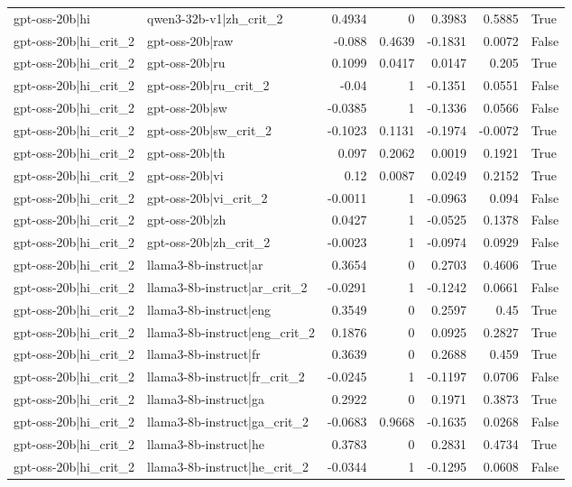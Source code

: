 \begin{table}
\begin{tabular}{l l r r r r l}
gpt-oss-20b|hi & qwen3-32b-v1|zh_crit_2 & 0.4934 & 0 & 0.3983 & 0.5885 & True \\
gpt-oss-20b|hi_crit_2 & gpt-oss-20b|raw & -0.088 & 0.4639 & -0.1831 & 0.0072 & False \\
gpt-oss-20b|hi_crit_2 & gpt-oss-20b|ru & 0.1099 & 0.0417 & 0.0147 & 0.205 & True \\
gpt-oss-20b|hi_crit_2 & gpt-oss-20b|ru_crit_2 & -0.04 & 1 & -0.1351 & 0.0551 & False \\
gpt-oss-20b|hi_crit_2 & gpt-oss-20b|sw & -0.0385 & 1 & -0.1336 & 0.0566 & False \\
gpt-oss-20b|hi_crit_2 & gpt-oss-20b|sw_crit_2 & -0.1023 & 0.1131 & -0.1974 & -0.0072 & True \\
gpt-oss-20b|hi_crit_2 & gpt-oss-20b|th & 0.097 & 0.2062 & 0.0019 & 0.1921 & True \\
gpt-oss-20b|hi_crit_2 & gpt-oss-20b|vi & 0.12 & 0.0087 & 0.0249 & 0.2152 & True \\
gpt-oss-20b|hi_crit_2 & gpt-oss-20b|vi_crit_2 & -0.0011 & 1 & -0.0963 & 0.094 & False \\
gpt-oss-20b|hi_crit_2 & gpt-oss-20b|zh & 0.0427 & 1 & -0.0525 & 0.1378 & False \\
gpt-oss-20b|hi_crit_2 & gpt-oss-20b|zh_crit_2 & -0.0023 & 1 & -0.0974 & 0.0929 & False \\
gpt-oss-20b|hi_crit_2 & llama3-8b-instruct|ar & 0.3654 & 0 & 0.2703 & 0.4606 & True \\
gpt-oss-20b|hi_crit_2 & llama3-8b-instruct|ar_crit_2 & -0.0291 & 1 & -0.1242 & 0.0661 & False \\
gpt-oss-20b|hi_crit_2 & llama3-8b-instruct|eng & 0.3549 & 0 & 0.2597 & 0.45 & True \\
gpt-oss-20b|hi_crit_2 & llama3-8b-instruct|eng_crit_2 & 0.1876 & 0 & 0.0925 & 0.2827 & True \\
gpt-oss-20b|hi_crit_2 & llama3-8b-instruct|fr & 0.3639 & 0 & 0.2688 & 0.459 & True \\
gpt-oss-20b|hi_crit_2 & llama3-8b-instruct|fr_crit_2 & -0.0245 & 1 & -0.1197 & 0.0706 & False \\
gpt-oss-20b|hi_crit_2 & llama3-8b-instruct|ga & 0.2922 & 0 & 0.1971 & 0.3873 & True \\
gpt-oss-20b|hi_crit_2 & llama3-8b-instruct|ga_crit_2 & -0.0683 & 0.9668 & -0.1635 & 0.0268 & False \\
gpt-oss-20b|hi_crit_2 & llama3-8b-instruct|he & 0.3783 & 0 & 0.2831 & 0.4734 & True \\
gpt-oss-20b|hi_crit_2 & llama3-8b-instruct|he_crit_2 & -0.0344 & 1 & -0.1295 & 0.0608 & False \\

\end{tabular}
\end{table}
